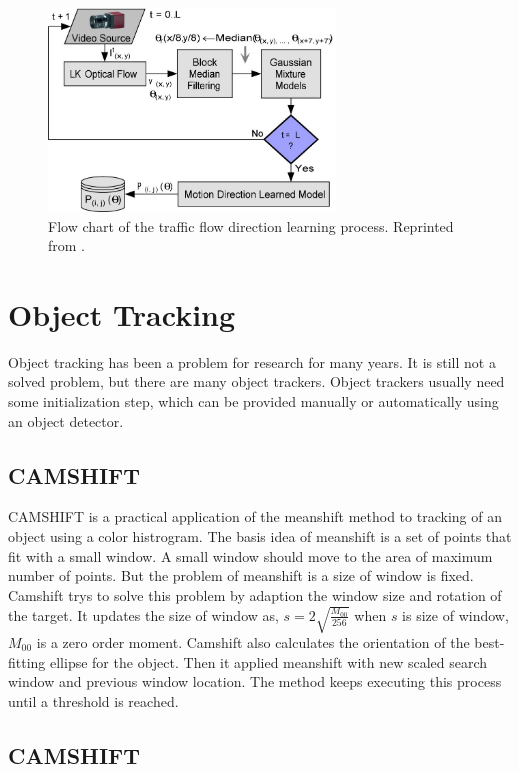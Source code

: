 \begin{figure}[h]
  \centering
  \includegraphics[width=3in]{figures/learning.jpg}  
  \caption[Learning flow chart]{Flow chart of the traffic flow direction learning process. Reprinted from  . }
  \label{fig:learning}
\end{figure}



\section{Object Tracking}
\label{Tracking}
Object tracking has been a problem for research for many years. It is still not a solved problem, but there are many object trackers. Object trackers usually need some initialization step, which can be provided manually or automatically using an object detector.

\subsection{CAMSHIFT}
CAMSHIFT is a practical application of the meanshift method to tracking of an object using a color histrogram. The basis idea of meanshift is a set of points that fit with a small window. A small window should move to the area of maximum number of points. But the problem of meanshift is a size of window is fixed. Camshift trys to solve this problem by adaption the window size and rotation of the target. It updates the size of window as, $ s = 2 \sqrt{\frac{M_{00}}{256}} $ when $s$ is size of window, $M_{00}$ is a zero order moment. Camshift also calculates the orientation of the best-fitting ellipse for the object. Then it applied meanshift with new scaled search window and previous window location. The method keeps executing this process until a threshold is reached.

\subsection{CAMSHIFT}

\FloatBarrier


